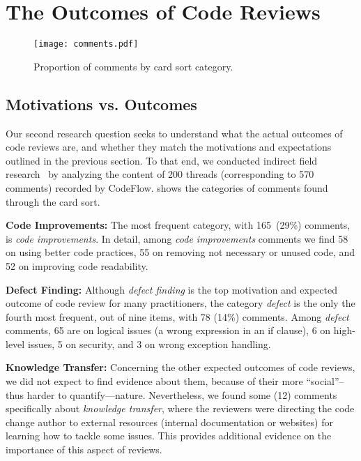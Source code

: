 
\section{The Outcomes of Code Reviews} \label{sec:outcomes}

\begin{figure}[t] %
   \centering
   \texttt{[image: comments.pdf]}
   \vspace{-1.5em}
   \caption{Proportion of comments by card sort category.}
   \label{fig:comments}
   \vspace{-1.5em}
\end{figure}

\subsection{Motivations vs. Outcomes}

Our second research question seeks to understand what the actual outcomes of code reviews are, and whether they match the motivations and expectations outlined in the previous section. To that end, we conducted indirect field research~\cite{lethbridge2005studying} by analyzing the content of 200 threads (corresponding to 570 comments) recorded by CodeFlow.  shows the categories of comments found through the card sort.

\textbf{Code Improvements:} The most frequent category, with 165~(29\%) comments, is \emph{code improvements}. In detail, among \emph{code improvements} comments we find 58 on using better code practices, 55 on removing not necessary or unused code, and 52 on improving code readability.

\textbf{Defect Finding:} Although \emph{defect finding} is the top motivation and expected outcome of code review for many practitioners, the category \emph{defect} is the only the fourth most frequent, out of nine items, with 78 (14\%) comments. Among \emph{defect} comments, 65 are on logical issues (\eg a wrong expression in an if clause), 6 on high-level issues, 5 on security, and 3 on wrong exception handling.

\textbf{Knowledge Transfer:} Concerning the other expected outcomes of code reviews, we did not expect to find evidence about them, because of their more ``social''--thus harder to quantify—nature. Nevertheless, we found some (12) comments specifically about \emph{knowledge transfer}, where the reviewers were directing the code change author to external resources (\eg internal documentation or websites) for learning how to tackle some issues. This provides additional evidence on the importance of this aspect of reviews.

